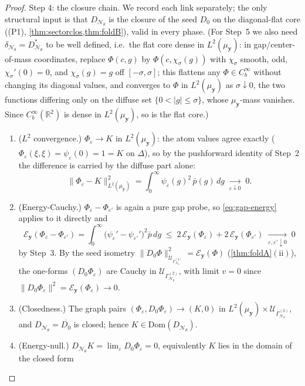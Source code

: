 \documentclass[reqno,final,11pt]{amsart}
\theoremstyle{plain}
\theoremstyle{definition}
\theoremstyle{remark}
\newcommand{\R}{\mathbb R}
\newcommand{\Dom}{\mathrm{Dom}}
\newcommand{\cE}{\mathcal E}
\newcommand{\cN}{\mathcal N}
\newcommand{\cU}{\mathcal U}
\newcommand{\GamN}{\Gamma^{(2)}_{\cN_\theta}}
\newcommand{\DN}{D_{\cN_\theta}}
\newcommand{\divN}{\delta_{\cN_\theta}}
\begin{document}
\begin{proof}
Step 4: the closure chain. We record each link separately; the only
structural input is that $\DN$ is the closure of the seed $D_0$ on the
diagonal-flat core (\textnormal{(P1)}, \cref{thm:sectorclos,thm:foldB}), valid
in every phase. (For Step~5 we also need $\divN=\DN^{*}$ to be well defined,
i.e.\ the flat core dense in $L^2(\mu_{\mathbf y})$: in gap/center-of-mass
coordinates, replace $\Phi(c,g)$ by $\Phi(c,\chi_\sigma(g))$ with
$\chi_\sigma$ smooth, odd, $\chi_\sigma'(0)=0$, and $\chi_\sigma(g)=g$ off
$[-\sigma,\sigma]$; this flattens any $\Phi\in C_b^\infty$ without changing
its diagonal values, and converges to $\Phi$ in $L^2(\mu_{\mathbf y})$ as
$\sigma\downarrow0$, the two functions differing only on the diffuse set
$\{0<|g|\le\sigma\}$, whose $\mu_{\mathbf y}$-mass vanishes. Since
$C_b^\infty(\R^2)$ is dense in $L^2(\mu_{\mathbf y})$, so is the flat core.)
\begin{enumerate}
\item[\textnormal{(a)}] ($L^2$ convergence.) $\Phi_\varepsilon\to K$ in
$L^2(\mu_{\mathbf y})$: the atom values agree exactly
($\Phi_\varepsilon(\xi,\xi)=\psi_\varepsilon(0)=1=K$ on $\Delta$), so by the
pushforward identity of Step~2 the difference is carried by the diffuse part
alone:
\[
  \|\Phi_\varepsilon-K\|^2_{L^2(\mu_{\mathbf y})}
  =\int_0^\infty\psi_\varepsilon(g)^2\,\bar p(g)\,dg
  \;\xrightarrow[\varepsilon\downarrow0]{}\;0 .
\]
\item[\textnormal{(b)}] (Energy-Cauchy.) $\Phi_\varepsilon-\Phi_{\varepsilon'}$
is again a pure gap probe, so \eqref{eq:gap-energy} applies to it directly and
\[
  \cE_{\mathbf y}(\Phi_\varepsilon-\Phi_{\varepsilon'})
  =\int_0^\infty\bigl(\psi_\varepsilon'-\psi_{\varepsilon'}'\bigr)^2\bar p\,dg
  \;\le\;2\,\cE_{\mathbf y}(\Phi_\varepsilon)+2\,\cE_{\mathbf y}(\Phi_{\varepsilon'})
  \;\xrightarrow[\varepsilon,\varepsilon'\downarrow0]{}\;0
\]
by Step~3. By the seed isometry
$\|D_0\Phi\|^2_{\cU_{\GamN}}=\cE_{\mathbf y}(\Phi)$
(\cref{thm:foldA}$(\mathrm{ii})$), the one-forms $(D_0\Phi_\varepsilon)$ are
Cauchy in $\cU_{\GamN}$, with limit $v=0$ since
$\|D_0\Phi_\varepsilon\|^2=\cE_{\mathbf y}(\Phi_\varepsilon)\to0$.
\item[\textnormal{(c)}] (Closedness.) The graph pairs
$(\Phi_\varepsilon,D_0\Phi_\varepsilon)\to(K,0)$ in
$L^2(\mu_{\mathbf y})\times\cU_{\GamN}$, and $\DN=\overline{D_0}$ is closed;
hence $K\in\Dom(\DN)$.
\item[\textnormal{(d)}] (Energy-null.) $\DN K=\lim_\varepsilon
D_0\Phi_\varepsilon=0$, equivalently $K$ lies in the domain of the closed form

\end{enumerate}
\end{proof}
\end{document}
